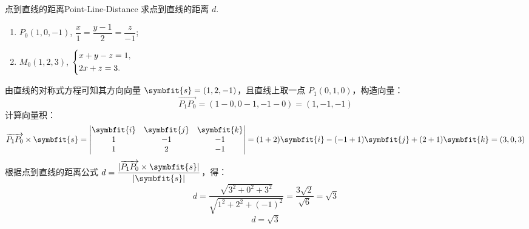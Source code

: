 \begin{problem}{点到直线的距离}{Point-Line-Distance}
    求点到直线的距离 $d$.
    \begin{enumerate}
        \item $P_0(1, 0, -1)$, $\dfrac{x}{1} = \dfrac{y-1}{2} = \dfrac{z}{-1}$;
        \item $M_0(1, 2, 3)$, $\begin{dcases} x + y - z = 1, \\ 2x + z = 3. \end{dcases}$
    \end{enumerate}
\end{problem}

\begin{solution}

    由直线的对称式方程可知其方向向量 $\symbfit{s} = (1, 2, -1)$，且直线上取一点 $P_1(0, 1, 0)$，构造向量：
    \begin{equation}
        \overrightarrow{P_1P_0} = (1 - 0, 0 - 1, -1 - 0) = (1, -1, -1)
    \end{equation}
    计算向量积：
    \begin{equation}
        \overrightarrow{P_1P_0} \times \symbfit{s} = \begin{vmatrix} \symbfit{i} & \symbfit{j} & \symbfit{k} \\ 1 & -1 & -1 \\ 1 & 2 & -1 \end{vmatrix} = (1 + 2)\symbfit{i} - (-1 + 1)\symbfit{j} + (2 + 1)\symbfit{k} = (3, 0, 3)
    \end{equation}
    根据点到直线的距离公式 $d = \dfrac{|\overrightarrow{P_1P_0} \times \symbfit{s}|}{|\symbfit{s}|}$，得：
    \begin{equation}
        d = \frac{\sqrt{3^2 + 0^2 + 3^2}}{\sqrt{1^2 + 2^2 + (-1)^2}} = \frac{3\sqrt{2}}{\sqrt{6}} = \sqrt{3}
    \end{equation}
    \begin{equation}
        \boxed{d = \sqrt{3}}
    \end{equation}



\end{solution}
